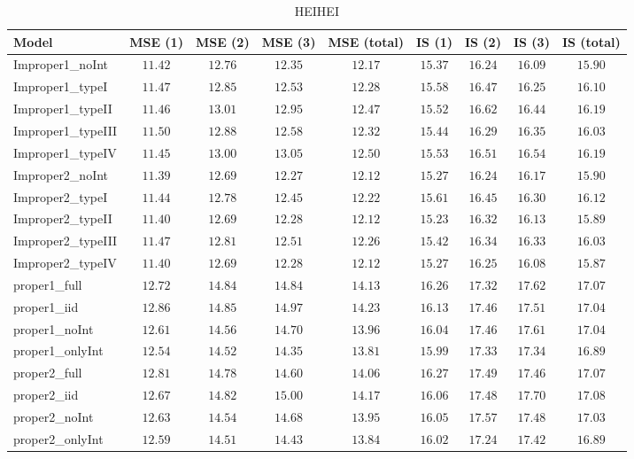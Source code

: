 \begin{table}

\caption{\label{tab:model-choice-sc5}HEIHEI}
\centering
\begin{tabular}{lcccccccc}
\hline
Model  & MSE (1) & MSE (2) & MSE (3) & MSE (total) & IS (1) & IS (2) & IS (3) & \multicolumn{1}{c}{IS (total)} \\ 
\hline
Improper1_noInt  & $11.42$ & $12.76$ & $12.35$ & $12.17$ & $15.37$ & $16.24$ & $16.09$ & $15.90$ \\
Improper1_typeI  & $11.47$ & $12.85$ & $12.53$ & $12.28$ & $15.58$ & $16.47$ & $16.25$ & $16.10$ \\
Improper1_typeII  & $11.46$ & $13.01$ & $12.95$ & $12.47$ & $15.52$ & $16.62$ & $16.44$ & $16.19$ \\
Improper1_typeIII  & $11.50$ & $12.88$ & $12.58$ & $12.32$ & $15.44$ & $16.29$ & $16.35$ & $16.03$ \\
Improper1_typeIV  & $11.45$ & $13.00$ & $13.05$ & $12.50$ & $15.53$ & $16.51$ & $16.54$ & $16.19$ \\
Improper2_noInt  & $11.39$ & $12.69$ & $12.27$ & $12.12$ & $15.27$ & $16.24$ & $16.17$ & $15.90$ \\
Improper2_typeI  & $11.44$ & $12.78$ & $12.45$ & $12.22$ & $15.61$ & $16.45$ & $16.30$ & $16.12$ \\
Improper2_typeII  & $11.40$ & $12.69$ & $12.28$ & $12.12$ & $15.23$ & $16.32$ & $16.13$ & $15.89$ \\
Improper2_typeIII  & $11.47$ & $12.81$ & $12.51$ & $12.26$ & $15.42$ & $16.34$ & $16.33$ & $16.03$ \\
Improper2_typeIV  & $11.40$ & $12.69$ & $12.28$ & $12.12$ & $15.27$ & $16.25$ & $16.08$ & $15.87$ \\
proper1_full  & $12.72$ & $14.84$ & $14.84$ & $14.13$ & $16.26$ & $17.32$ & $17.62$ & $17.07$ \\
proper1_iid  & $12.86$ & $14.85$ & $14.97$ & $14.23$ & $16.13$ & $17.46$ & $17.51$ & $17.04$ \\
proper1_noInt  & $12.61$ & $14.56$ & $14.70$ & $13.96$ & $16.04$ & $17.46$ & $17.61$ & $17.04$ \\
proper1_onlyInt  & $12.54$ & $14.52$ & $14.35$ & $13.81$ & $15.99$ & $17.33$ & $17.34$ & $16.89$ \\
proper2_full  & $12.81$ & $14.78$ & $14.60$ & $14.06$ & $16.27$ & $17.49$ & $17.46$ & $17.07$ \\
proper2_iid  & $12.67$ & $14.82$ & $15.00$ & $14.17$ & $16.06$ & $17.48$ & $17.70$ & $17.08$ \\
proper2_noInt  & $12.63$ & $14.54$ & $14.68$ & $13.95$ & $16.05$ & $17.57$ & $17.48$ & $17.03$ \\
proper2_onlyInt  & $12.59$ & $14.51$ & $14.43$ & $13.84$ & $16.02$ & $17.24$ & $17.42$ & $16.89$ \\
\hline 
\end{tabular}


\end{table}